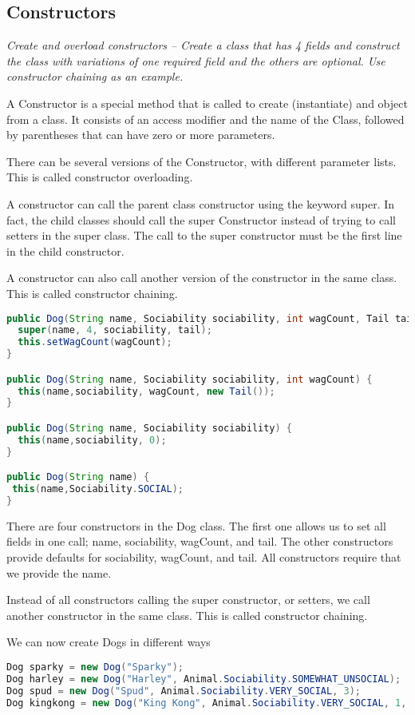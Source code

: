 \subsection{Constructors}
\textit{Create and overload constructors -- Create a class that has 4 fields and construct the class with variations of one required field and the others are optional.  Use constructor chaining as an example.}

A Constructor is a special method that is called to create (instantiate) and object from a class. It consists of an access modifier and the name of the Class, followed by parentheses that can have zero or more parameters.

There can be several versions of the Constructor, with different parameter lists. This is called constructor overloading.

A constructor can call the parent class constructor using the keyword super. In fact, the child classes should call the super Constructor instead of trying to call setters in the super class. The call to the super constructor must be the first line in the child constructor.

A constructor can also call another version of the constructor in the same class. This is called constructor chaining.

\begin{lstlisting}[language=Java]
public Dog(String name, Sociability sociability, int wagCount, Tail tail) {
  super(name, 4, sociability, tail);
  this.setWagCount(wagCount);
}

public Dog(String name, Sociability sociability, int wagCount) {
  this(name,sociability, wagCount, new Tail());
}

public Dog(String name, Sociability sociability) {
  this(name,sociability, 0);
}

public Dog(String name) {
 this(name,Sociability.SOCIAL);
}
\end{lstlisting}\label{code:constructors} 

There are four constructors in the Dog class. The first one allows us to set all fields in one call; name, sociability, wagCount, and tail. The other constructors provide defaults for sociability, wagCount, and tail. All constructors require that we provide the name.

Instead of all constructors calling the super constructor, or setters, we call another constructor in the same class. This is called constructor chaining.

We can now create Dogs in different ways
\begin{lstlisting}[language=Java]
Dog sparky = new Dog("Sparky");
Dog harley = new Dog("Harley", Animal.Sociability.SOMEWHAT_UNSOCIAL);
Dog spud = new Dog("Spud", Animal.Sociability.VERY_SOCIAL, 3);
Dog kingkong = new Dog("King Kong", Animal.Sociability.VERY_SOCIAL, 1, new Tail(true, 1));
\end{lstlisting}

